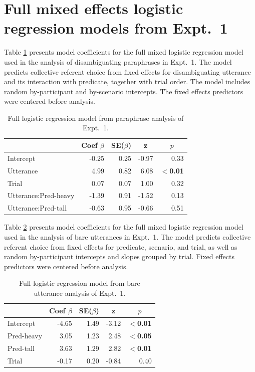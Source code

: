 \documentclass[preprint,12pt,authoryear,titlepage]{elsarticle}
\begin{document}

\appendix

\section{Full mixed effects logistic regression models from Expt.~1}\label{expt1results}


Table \ref{expt1analysis1} presents model coefficients for the full mixed logistic regression model used in the analysis of disambiguating paraphrases in Expt.~1. The model predicts collective referent choice from fixed effects for disambiguating utterance and its interaction with predicate, together with trial order. The model includes random by-participant and by-scenario intercepts. The fixed effects predictors were centered before analysis.

\begin{table}[htb] 
	\renewcommand\thetable{A.1}
	\centering \caption{Full logistic regression model from paraphrase analysis of Expt.~1.} \label{expt1analysis1}
	\begin{tabular}{lrrrr}\toprule
		&	Coef $\beta$	&	SE($\beta$)	&	\multicolumn{1}{c}{ \textbf{z}}	&	\multicolumn{1}{c}{$p$}\\ \midrule
		Intercept	&	-0.25	&	0.25	&	-0.97	&	0.33\\
		Utterance	&	4.99	&	0.82	&	6.08	&	\textbf{$<$0.01}\\
		Trial	&	0.07	&	0.07	&	1.00	&	0.32\\
		Utterance:Pred-heavy&	-1.39	&	0.91	&	-1.52	&	0.13\\
		Utterance:Pred-tall&	-0.63	&	0.95	&	-0.66	&	0.51\\
		\bottomrule
	\end{tabular}
\end{table}

Table \ref{expt1analysis2} presents model coefficients for the full mixed logistic regression model used in the analysis of bare utterances in Expt.~1. The model predicts collective referent choice from fixed effects for predicate, scenario, and trial, as well as random by-participant intercepts and slopes grouped by trial. Fixed effects predictors were centered before analysis.


\begin{table}[htb] 
	\renewcommand\thetable{A.2}
	\centering \caption{Full logistic regression model from bare utterance analysis of Expt.~1.} \label{expt1analysis2}
	\begin{tabular}{lrrrr}\toprule
		&	Coef $\beta$	&	SE($\beta$)	&	\multicolumn{1}{c}{ \textbf{z}}	&	\multicolumn{1}{c}{$p$}\\ \midrule
		Intercept	&	-4.65	&	1.49	&	-3.12	&	\textbf{$<$0.01}\\
		Pred-heavy	&	3.05	&	1.23	&	2.48	&	\textbf{$<$0.05}\\
		Pred-tall	&	3.63	&	1.29	&	2.82	&	\textbf{$<$0.01}\\
		Trial	&	-0.17	&	0.20	&	-0.84	&	0.40\\
		\bottomrule
	\end{tabular}
\end{table}
\end{document}
